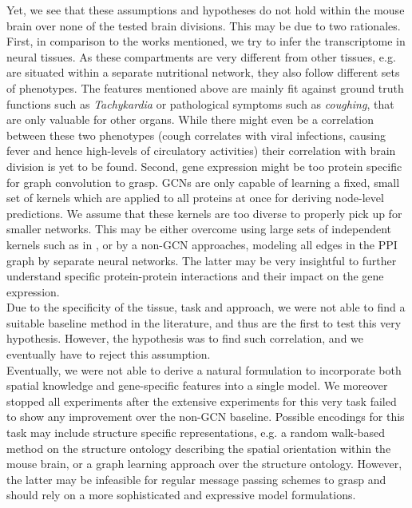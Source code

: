\documentclass[]{article}
\begin{document}
Yet, we see that these assumptions and hypotheses do not hold within the mouse brain over none of the tested brain divisions. This may be due to two rationales. First, in comparison to the works mentioned, we try to infer the transcriptome in neural tissues. As these compartments are very different from other tissues, e.g. are situated within a separate nutritional network, they also follow different sets of phenotypes. The features mentioned above are mainly fit against ground truth functions such as \textit{Tachykardia} or pathological symptoms such as \textit{coughing}, that are only valuable for other organs. While there might even be a correlation between these two phenotypes  (cough correlates with viral infections, causing fever and hence high-levels of circulatory activities) their correlation with brain division is yet to be found. Second, gene expression might be too protein specific for graph convolution to grasp. GCNs are only capable of learning a fixed, small set of kernels which are applied to all proteins at once for deriving node-level predictions. We assume that these kernels are too diverse to properly pick up for smaller networks. This may be either overcome using large sets of independent kernels such as in \citet{schulte2021integration}, or by a non-GCN approaches, modeling all edges in the PPI graph by separate neural networks. The latter may be very insightful to further understand specific protein-protein interactions and their impact on the gene expression. \\

Due to the specificity of the tissue, task and approach, we were not able to find a suitable baseline method in the literature, and thus are the first to test this very hypothesis. However, the hypothesis was to find such correlation, and we eventually have to reject this assumption.\\

Eventually, we were not able to derive a natural formulation to incorporate both spatial knowledge and gene-specific features into a single model. We moreover stopped all experiments after the extensive experiments for this very task failed to show any improvement over the non-GCN baseline. Possible encodings for this task may include structure specific representations, e.g. a random walk-based method on the structure ontology describing the spatial orientation within the mouse brain, or a graph learning approach over the structure ontology. However, the latter may be infeasible for regular message passing schemes to grasp and should rely on a more sophisticated and expressive model formulations.
\end{document}
